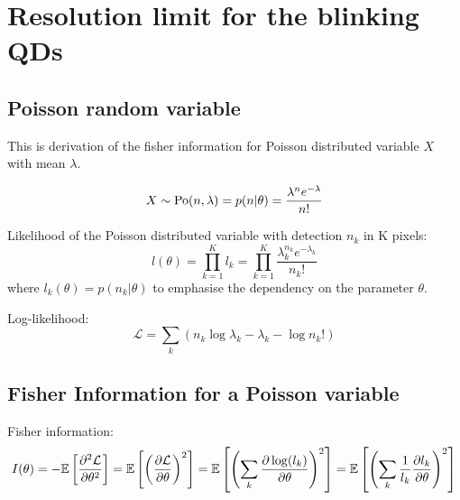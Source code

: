 \chapter{Resolution limit for the blinking QDs\label{app:Resolution limit for the blinking QDs}}


\section{Poisson random variable}

This is derivation of the fisher information for Poisson distributed variable $X$ with mean $\lambda$.

\begin{equation}
	X\sim\mathrm{Po}(n,\lambda)=p(n|\theta)=\frac{\lambda^n e^{-\lambda}}{n!}
\end{equation}

Likelihood of the Poisson distributed variable with detection $n_k$ in K pixels: 
%
\begin{equation}
	l(\theta)=\prod_{k=1}^Kl_k=\prod_{k=1}^K\frac{\lambda_k^{n_k}e^{-\lambda_k}}{n_k!}
	\label{eq:Likelihood of Poisson}
\end{equation}
%
where $l_k(\theta)=p(n_k|\theta)$ to emphasise the dependency on the parameter $\theta$.

Log-likelihood:
%
\begin{equation}
	\mathcal{L}=\sum_k\left(n_k\log\lambda_k-\lambda_k-\log n_k!\right)
\end{equation}


\section{Fisher Information for a Poisson variable\label{sub: Appendix Fisher-Information-Poisson}}

Fisher information:
%
\begin{equation}
	I(\theta)=-\mathbb{E}\left[\frac{\partial^2\mathcal{L}}{\partial\theta^2}\right]=\mathbb{E}\left[\left(\frac{\partial\mathcal{L}}{\partial\theta}\right)^2\right]=\mathbb{E}\left[\left(\sum_k\frac{\partial\log(l_k)}{\partial\theta}\right)^2\right]=\mathbb{E}\left[\left(\sum_k\frac{1}{l_k}\frac{\partial l_k}{\partial\theta}\right)^2\right]
	\label{eq:Fisher Info Definition}
\end{equation}

